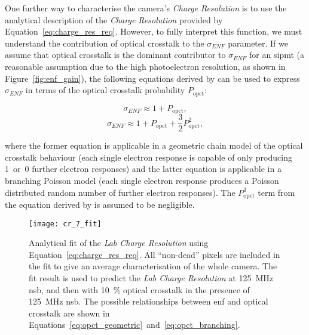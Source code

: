 One further way to characterise the camera's \textit{Charge Resolution} is to use the analytical description of the \textit{Charge Resolution} provided by Equation~\ref{eq:charge_res_req}. However, to fully interpret this function, we must understand the contribution of optical crosstalk to the $\sigma_{ENF}$ parameter. If we assume that optical crosstalk is the dominant contributor to $\sigma_{ENF}$ for an \gls{sipmt} (a reasonable assumption due to the high photoelectron resolution, as shown in Figure~\ref{fig:enf_gain}), the following equations derived by \textcite{Vinogradov2012} can be used to express $\sigma_{ENF}$ in terms of the optical crosstalk probability $P_\text{opct}$:
\begin{minipage}{\textwidth}
\begin{equation} \label{eq:opct_geometric}
\sigma_{ENF} \approx 1 + P_\text{opct},
\end{equation}
\begin{equation} \label{eq:opct_branching}
\sigma_{ENF} \approx 1 + P_\text{opct} + \frac{3}{2} P_\text{opct}^2,
\end{equation}
\end{minipage}
where the former equation is applicable in a geometric chain model of the optical crosstalk behaviour (each single electron response is capable of only producing 1~or~0 further electron responses) and the latter equation is applicable in a branching Poisson model (each single electron response produces a Poisson distributed random number of further electron responses). The $P_\text{opct}^3$ term from the equation derived by \textcite{Vinogradov2012} is assumed to be negligible.

\begin{figure}[h]
	\centering
    \texttt{[image: cr\_7\_fit]} 
	\caption[Analytical fit of the \textit{Lab Charge Resolution}.]{Analytical fit of the \textit{Lab Charge Resolution} using Equation~\ref{eq:charge_res_req}. All ``non-dead'' pixels are included in the fit to give an average characterisation of the whole camera. The fit result is used to predict the \textit{Lab Charge Resolution} at \SI{125}{MHz} \gls{nsb}, and then with \SI{10}{\percent} optical crosstalk in the presence of \SI{125}{MHz} \gls{nsb}. The possible relationships between \gls{enf} and optical crosstalk are shown in Equations~\ref{eq:opct_geometric}~and~\ref{eq:opct_branching}.}
	\label{fig:cr_7_fit}
\end{figure}

